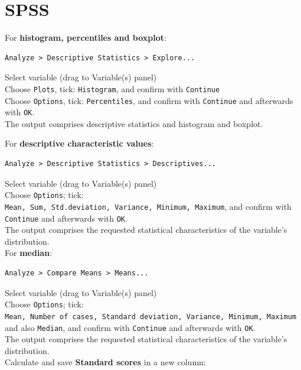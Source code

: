 \documentclass[
]{book}
\begin{document}
\section{SPSS}\label{spss-3}

For \textbf{histogram, percentiles and boxplot}:

\begin{verbatim}
Analyze > Descriptive Statistics > Explore...
\end{verbatim}

Select variable (drag to Variable(s) panel)\\
Choose \texttt{Plots}, tick: \texttt{Histogram}, and confirm with \texttt{Continue}\\
Choose \texttt{Options}, tick: \texttt{Percentiles}, and confirm with \texttt{Continue} and
afterwards with \texttt{OK}.\\
The output comprises descriptive statistics and histogram and
boxplot.

For \textbf{descriptive characteristic values}:~

\begin{verbatim}
Analyze > Descriptive Statistics > Descriptives...
\end{verbatim}

Select variable (drag to Variable(s) panel)\\
Choose \texttt{Options}; tick:
\texttt{Mean,\ Sum,\ Std.deviation,\ Variance,\ Minimum,\ Maximum}, and confirm with
\texttt{Continue} and afterwards with \texttt{OK}.\\
The output comprises the requested statistical characteristics of the variable's distribution.\\

For \textbf{median}:\\

\begin{verbatim}
Analyze > Compare Means > Means...
\end{verbatim}

Select variable (drag to Variable(s) panel)\\
Choose \texttt{Options}; tick:
\texttt{Mean,\ Number\ of\ cases,\ Standard\ deviation,\ Variance,\ Minimum,\ Maximum}
and also \texttt{Median}, and confirm with \texttt{Continue} and afterwards with \texttt{OK}.\\
The output comprises the requested statistical characteristics of the variable's distribution.\\

Calculate and save \textbf{Standard scores} in a new column:\\
\end{document}

